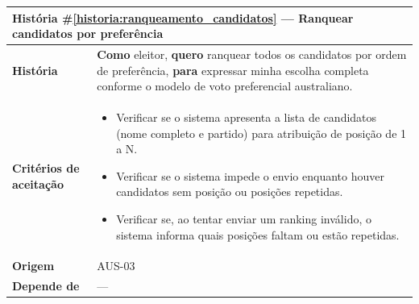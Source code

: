 \documentclass[12pt,a4paper]{article}
\newcounter{historia}
\begin{document}
\vspace{0.5cm}

\label{historia:ranqueamento_candidatos}
\begin{table}[H]
    \centering
    \begin{tabular}{|m{4.5cm} | m{11cm}|}
    \hline
    
    \multicolumn{2}{|l|}{\textbf{História \#\ref{historia:ranqueamento_candidatos} --- Ranquear candidatos por preferência}} \\
    
    \hline   \textbf{História} &
    \textbf{Como} eleitor, \newline
    \textbf{quero} ranquear todos os candidatos por ordem de preferência, \newline  
    \textbf{para} expressar minha escolha completa conforme o modelo de voto preferencial australiano. \\
    
    \textbf{Critérios de aceitação} &
    \begin{itemize}
        \item{Verificar se o sistema apresenta a lista de candidatos (nome completo e partido) para atribuição de posição de 1 a N.}
        \item{Verificar se o sistema impede o envio enquanto houver candidatos sem posição ou posições repetidas.}
        \item{Verificar se, ao tentar enviar um ranking inválido, o sistema informa quais posições faltam ou estão repetidas.}
    \end{itemize}\\
    
    
    \textbf{Origem} &
    AUS-03 \\
    
    \textbf{Depende de} &
    --- \\
    
    \hline
    \end{tabular}
\end{table}
\end{document}
